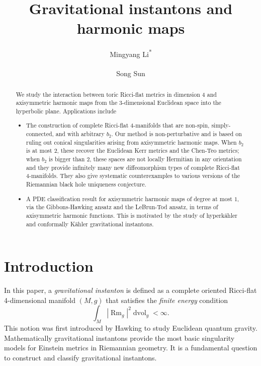 \documentclass[a4paper,11pt]{amsart}
\title{Gravitational instantons and harmonic maps}
\author{
Mingyang Li\textsuperscript{*}}
\author{Song Sun\textsuperscript{\dag}}
\theoremstyle{definition}
\numberwithin{equation}{section}
\DeclareMathOperator{\dvol}{dvol}
\DeclareMathOperator{\Rm}{Rm}
\begin{document}
\begin{abstract}
We study the interaction between toric Ricci-flat metrics in dimension 4 and axisymmetric harmonic maps from the 3-dimensional Euclidean space into the hyperbolic plane. Applications include 
\begin{itemize}
    \item The construction of complete Ricci-flat 4-manifolds that are non-spin, simply-connected, and with arbitrary $b_2$. Our method is non-perturbative and is based on ruling out conical singularities arising from axisymmetric harmonic maps. When $b_2$ is at most $2$, these recover the Euclidean Kerr metrics and the Chen-Teo metrics; when $b_2$ is bigger than $2$, these spaces are not locally Hermitian in any orientation and they provide infinitely many new diffeomorphism types of complete Ricci-flat 4-manifolds. They also give systematic counterexamples to various versions of the Riemannian black hole uniqueness conjecture. 
    \item  A PDE classification result for axisymmetric harmonic maps of degree at most $1$, via the Gibbons-Hawking ansatz and the LeBrun-Tod ansatz, in terms of axisymmetric harmonic functions. This is motivated by the study of hyperk\"ahler and conformally K\"ahler gravitational instantons.
\end{itemize}
  
\end{abstract}



\maketitle

\tableofcontents





\section{Introduction}
 
 In this paper, a \emph{gravitational instanton} is defined as a complete oriented Ricci-flat 4-dimensional  manifold $(M, g)$ that satisfies the \emph{finite energy} condition \begin{equation}\int_{M}|\Rm_g|^2\dvol_g<\infty.
 \end{equation}
 This notion was first introduced by Hawking \cite{Hawking} to study Euclidean quantum gravity. Mathematically gravitational instantons provide the most basic singularity models for Einstein metrics in Riemannian geometry. It is a fundamental question to construct and classify gravitational instantons.
\end{document}
